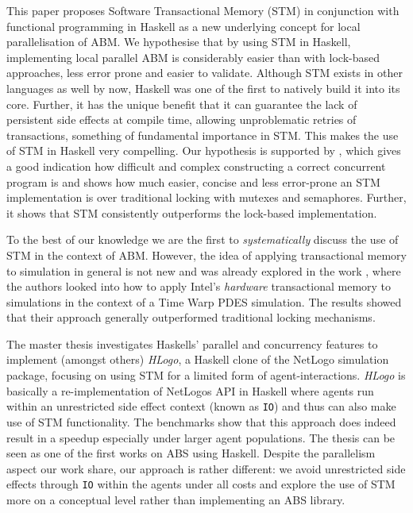 This paper proposes Software Transactional Memory (STM) in conjunction with functional programming in Haskell \citep{hudak_history_2007} as a new underlying concept for local parallelisation of ABM. We hypothesise that by using STM in Haskell, implementing local parallel ABM is considerably easier than with lock-based approaches, less error prone and easier to validate. Although STM exists in other languages as well by now, Haskell was one of the first to natively build it into its core. Further, it has the unique benefit that it can guarantee the lack of persistent side effects at compile time, allowing unproblematic retries of transactions, something of fundamental importance in STM. This makes the use of STM in Haskell very compelling. 
Our hypothesis is supported by \cite{discolo_lock_2006}, which gives a good indication how difficult and complex constructing a correct concurrent program is and shows how much easier, concise and less error-prone an STM implementation is over traditional locking with mutexes and semaphores. Further, it shows that STM consistently outperforms the lock-based implementation.


\medskip

To the best of our knowledge we are the first to \textit{systematically} discuss the use of STM in the context of ABM. However, the idea of applying transactional memory to simulation in general is not new and was already explored in the work \cite{hay_experiments_2015}, where the authors looked into how to apply Intel’s \textit{hardware} transactional memory to simulations in the context of a Time Warp PDES simulation. The results showed that their approach generally outperformed traditional locking mechanisms.

The master thesis \cite{bezirgiannis_improving_2013} investigates Haskells' parallel and concurrency features to implement (amongst others) \textit{HLogo}, a Haskell clone of the NetLogo \cite{wilensky_introduction_2015} simulation package, focusing on using STM for a limited form of agent-interactions. \textit{HLogo} is basically a re-implementation of NetLogos API in Haskell where agents run within an unrestricted side effect context (known as \texttt{IO}) and thus can also make use of STM functionality. The benchmarks show that this approach does indeed result in a speedup especially under larger agent populations. The thesis can be seen as one of the first works on ABS using Haskell. Despite the parallelism aspect our work share, our approach is rather different: we avoid unrestricted side effects through \texttt{IO} within the agents under all costs and explore the use of STM more on a conceptual level rather than implementing an ABS library.

